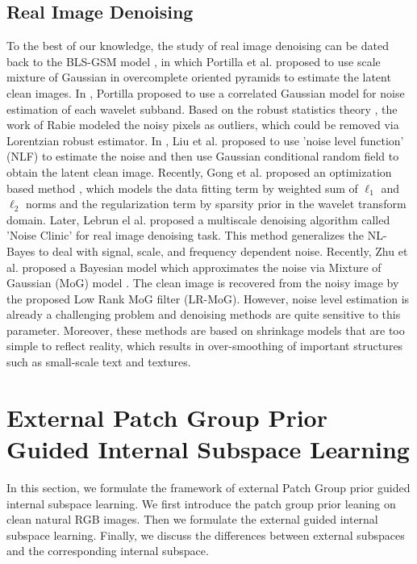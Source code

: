 \documentclass[10pt,twocolumn,letterpaper]{article}
\begin{document}
\subsection{Real Image Denoising}
To the best of our knowledge, the study of real image denoising can be dated back to the BLS-GSM model \cite{blsgsm}, in which Portilla et al. proposed to use scale mixture of Gaussian in overcomplete oriented pyramids to estimate the latent clean images. In \cite{fullyblind}, Portilla proposed to use a correlated Gaussian model for noise estimation of each wavelet subband. Based on the robust statistics theory \cite{huber2011robust}, the work of Rabie \cite{rabie2005robust} modeled the noisy pixels as outliers, which could be removed via Lorentzian robust estimator. In \cite{Liu2008}, Liu et al. proposed to use 'noise level function' (NLF) to estimate the noise and then use Gaussian conditional random field to obtain the latent clean image. Recently, Gong et al. proposed an optimization based method \cite{almapg}, which models the data fitting term by weighted sum of $\ell_{1}$ and $\ell_{2}$ norms and the regularization term by sparsity prior in the wavelet transform domain. Later, Lebrun el al. proposed a multiscale denoising algorithm called 'Noise Clinic' \cite{noiseclinic} for real image denoising task. This method generalizes the NL-Bayes \cite{nlbayes} to deal with signal, scale, and frequency dependent noise. Recently, Zhu et al. proposed a Bayesian model \cite{Zhu_2016_CVPR} which approximates the noise via Mixture of Gaussian (MoG) model \cite{Bishop}. The clean image is recovered from the noisy image by the proposed Low Rank MoG filter (LR-MoG). However, noise level estimation is already a challenging problem and denoising methods are quite sensitive to this parameter. Moreover, these methods are based on shrinkage models that are too simple to reflect reality, which results in over-smoothing of important structures such as small-scale text and textures. 

\section{External Patch Group Prior Guided Internal Subspace Learning}
In this section, we formulate the framework of external Patch Group prior guided internal subspace learning. We first introduce the patch group prior leaning on clean natural RGB images. Then we formulate the external guided internal subspace learning. Finally, we discuss the differences between external subspaces and the corresponding internal subspace.
\end{document}
